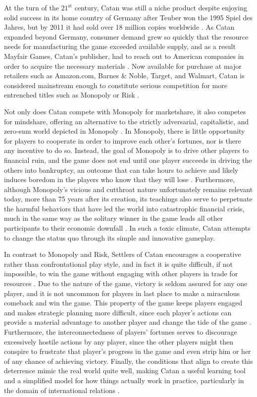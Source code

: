 \documentclass[pageno]{jpaper}
\begin{document}
\begin{doublespacing}
At the turn of the $21^{\text{st}}$ century, Catan was still a niche product despite enjoying solid success in its home country of Germany after Teuber won the 1995 Spiel des Jahres, but by 2011 it had sold over 18 million copies worldwide \cite{raphel2014,wingrove2011}. As Catan expanded beyond Germany, consumer demand grew so quickly that the resource needs for manufacturing the game exceeded available supply, and as a result Mayfair Games, Catan's publisher, had to reach out to American companies in order to acquire the necessary materials \cite{raphel2014}. Now available for purchase at major retailers such as Amazon.com, Barnes \& Noble, Target, and Walmart, Catan is considered mainstream enough to constitute serious competition for more entrenched titles such as Monopoly or Risk \cite{eskin2010,law2010,raphel2014,wingrove2011}. 

Not only does Catan compete with Monopoly for marketshare, it also competes for mindshare, offering an alternative to the strictly adversarial, capitalistic, and zero-sum world depicted in Monopoly \cite{eskin2010,wingrove2011}. In Monopoly, there is little opportunity for players to cooperate in order to improve each other's fortunes, nor is there any incentive to do so. Instead, the goal of Monopoly is to drive other players to financial ruin, and the game does not end until one player succeeds in driving the others into bankruptcy, an outcome that can take hours to achieve and likely induces boredom in the players who know that they will lose \cite{eskin2010}. Furthermore, although Monopoly's vicious and cutthroat nature unfortunately remains relevant today, more than 75 years after its creation, its teachings also serve to perpetuate the harmful behaviors that have led the world into catastrophic financial crisis, much in the same way as the solitary winner in the game leads all other participants to their economic downfall \cite{eskin2010}. In such a toxic climate, Catan attempts to change the status quo through its simple and innovative gameplay.

In contrast to Monopoly and Risk, Settlers of Catan encourages a cooperative rather than confrontational play style, and in fact it is quite difficult, if not impossible, to win the game without engaging with other players in trade for resources \cite{eskin2010,wingrove2011}. Due to the nature of the game, victory is seldom assured for any one player, and it is not uncommon for players in last place to make a miraculous comeback and win the game. This property of the game keeps players engaged and makes strategic planning more difficult, since each player's actions can provide a material advantage to another player and change the tide of the game \cite{eskin2010}. Furthermore, the interconnectedness of players' fortunes serves to discourage excessively hostile actions by any player, since the other players might then conspire to frustrate that player's progress in the game and even strip him or her of any chance of achieving victory. Finally, the conditions that align to create this deterrence mimic the real world quite well, making Catan a useful learning tool and a simplified model for how things actually work in practice, particularly in the domain of international relations \cite{eskin2010}. 


\end{doublespacing}
\end{document}
